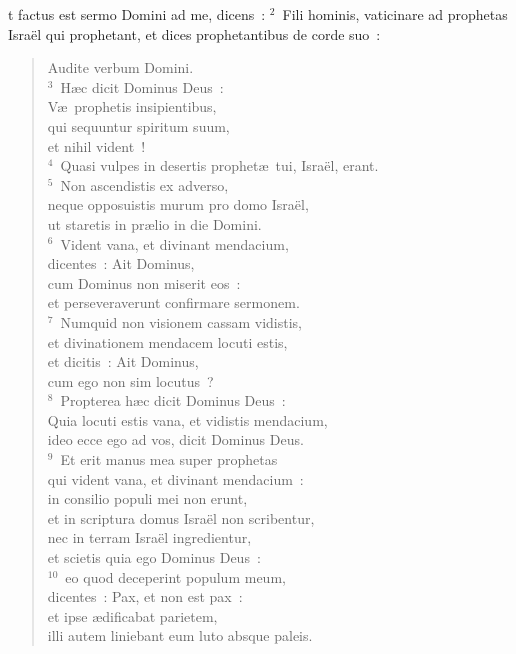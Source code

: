 \bchapter
{}t factus est sermo Domini ad me, dicens~:
${}^{2}$~Fili hominis, vaticinare ad prophetas Isra\"el qui prophetant, et dices prophetantibus de corde suo~: \begin{verse}Audite verbum Domini.\\
${}^{3}$~H\ae c dicit Dominus Deus~:\\ V\ae\ prophetis insipientibus,\\ qui sequuntur spiritum suum,\\ et nihil vident~!\\
${}^{4}$~Quasi vulpes in desertis prophet\ae\ tui, Isra\"el, erant.\\
${}^{5}$~Non ascendistis ex adverso,\\ neque opposuistis murum pro domo Isra\"el,\\ ut staretis in pr\ae lio in die Domini.\\
${}^{6}$~Vident vana, et divinant mendacium,\\ dicentes~: Ait Dominus,\\ cum Dominus non miserit eos~:\\ et perseveraverunt confirmare sermonem.\\
${}^{7}$~Numquid non visionem cassam vidistis,\\ et divinationem mendacem locuti estis,\\ et dicitis~: Ait Dominus,\\ cum ego non sim locutus~?\\
${}^{8}$~Propterea h\ae c dicit Dominus Deus~:\\ Quia locuti estis vana, et vidistis mendacium,\\ ideo ecce ego ad vos, dicit Dominus Deus.\\
${}^{9}$~Et erit manus mea super prophetas\\ qui vident vana, et divinant mendacium~:\\ in consilio populi mei non erunt,\\ et in scriptura domus Isra\"el non scribentur,\\ nec in terram Isra\"el ingredientur,\\ et scietis quia ego Dominus Deus~:\\
${}^{10}$~eo quod deceperint populum meum,\\ dicentes~: Pax, et non est pax~:\\ et ipse \ae dificabat parietem,\\ illi autem liniebant eum luto absque paleis.\\

\end{verse}
